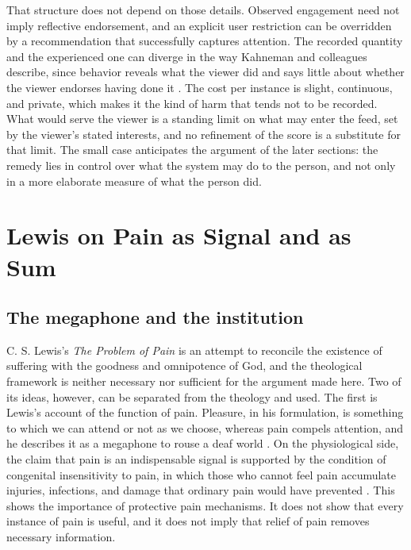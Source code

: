 \documentclass[11pt]{article}
\begin{document}
That structure does not depend on those details. Observed engagement need not imply reflective endorsement, and an explicit user restriction can be overridden by a recommendation that successfully captures attention. The recorded quantity and the experienced one can diverge in the way Kahneman and colleagues describe, since behavior reveals what the viewer did and says little about whether the viewer endorses having done it \citep{kahneman1997}. The cost per instance is slight, continuous, and private, which makes it the kind of harm that tends not to be recorded. What would serve the viewer is a standing limit on what may enter the feed, set by the viewer's stated interests, and no refinement of the score is a substitute for that limit. The small case anticipates the argument of the later sections: the remedy lies in control over what the system may do to the person, and not only in a more elaborate measure of what the person did.

\section{Lewis on Pain as Signal and as Sum}

\subsection{The megaphone and the institution}

C. S. Lewis's \emph{The Problem of Pain} is an attempt to reconcile the existence of suffering with the goodness and omnipotence of God, and the theological framework is neither necessary nor sufficient for the argument made here. Two of its ideas, however, can be separated from the theology and used. The first is Lewis's account of the function of pain. Pleasure, in his formulation, is something to which we can attend or not as we choose, whereas pain compels attention, and he describes it as a megaphone to rouse a deaf world \citep[chap.~6]{lewis1940}. On the physiological side, the claim that pain is an indispensable signal is supported by the condition of congenital insensitivity to pain, in which those who cannot feel pain accumulate injuries, infections, and damage that ordinary pain would have prevented \citep{cox2006}. This shows the importance of protective pain mechanisms. It does not show that every instance of pain is useful, and it does not imply that relief of pain removes necessary information.
\end{document}
